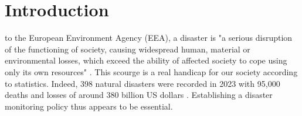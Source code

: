 \documentclass[journal]{IEEEtran}
\begin{document}
\maketitle


\IEEEdisplaynontitleabstractindextext







%
\IEEEpeerreviewmaketitle



\section{Introduction}
% 
% 
% 
% 
 to the European Environment Agency (EEA), a disaster is "a serious disruption of the functioning of society, causing widespread human, material or environmental losses, which exceed the ability of affected society to cope using only its own resources" \cite{noauthor_disaster_nodate}. This scourge is a real handicap for our society according to statistics. Indeed, 398 natural disasters were recorded in 2023  with 95,000 deaths and losses of around 380 billion US dollars \cite{burgueno_salas_global_nodate} \cite{noauthor_number_nodate}. Establishing a disaster monitoring policy thus appears to be essential. 
\end{document}
